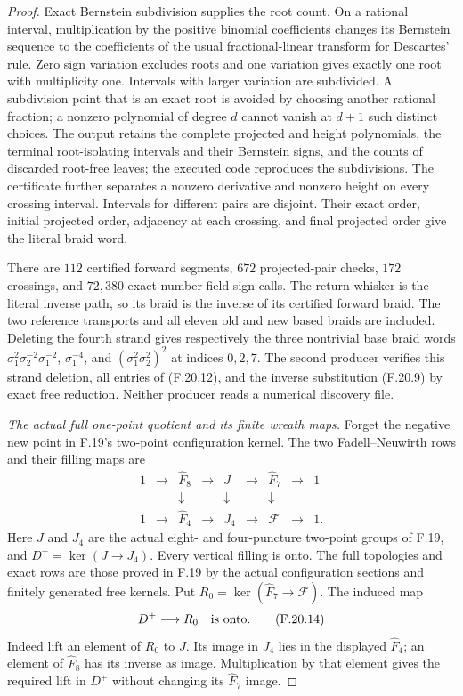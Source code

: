 \begin{proof}
Exact Bernstein subdivision supplies the root count.
On a rational interval, multiplication by the positive
binomial coefficients changes its Bernstein sequence
to the coefficients of the usual fractional-linear
transform for Descartes' rule. Zero sign variation
excludes roots and one variation gives exactly one
root with multiplicity one. Intervals with larger
variation are subdivided. A subdivision point that
is an exact root is avoided by choosing another
rational fraction; a nonzero polynomial of degree
$d$ cannot vanish at $d+1$ such distinct choices.
The output retains the complete projected and height
polynomials, the terminal root-isolating intervals
and their Bernstein signs, and the counts of discarded
root-free leaves; the executed code reproduces the
subdivisions. The certificate further
separates a nonzero derivative and nonzero height
on every crossing interval.
Intervals for different pairs are disjoint.
Their exact order, initial projected order,
adjacency at each crossing, and final projected
order give the literal braid word.

There are $112$ certified forward segments,
$672$ projected-pair checks, $172$ crossings, and
$72,380$ exact number-field sign calls.
The return whisker is the literal inverse path,
so its braid is the inverse of its certified
forward braid. The two reference transports and
all eleven old and new based braids are included.
Deleting the fourth strand gives respectively the
three nontrivial base braid words
$\sigma_1^2\sigma_2^{-2}\sigma_1^{-2}$,
$\sigma_1^{-4}$, and
$(\sigma_1^2\sigma_2^2)^2$ at indices $0,2,7$.
The second producer verifies this strand deletion,
all entries of (F.20.12), and the inverse substitution
(F.20.9) by exact free reduction.
Neither producer reads a numerical discovery file.

\emph{The actual full one-point quotient and its finite wreath maps.}
Forget the negative new point in F.19's two-point
configuration kernel. The two Fadell--Neuwirth rows
and their filling maps are
\[
 \begin{array}{ccccccccc}
 1&\longrightarrow&\widehat F_8&\longrightarrow&J
                 &\longrightarrow&\widehat F_7&\longrightarrow&1\\
 &&\downarrow&&\downarrow&&\downarrow\\
 1&\longrightarrow&\widehat F_4&\longrightarrow&J_4
                 &\longrightarrow&\mathcal F&\longrightarrow&1 .
 \end{array}                                                  \tag{F.20.13}
\]
Here $J$ and $J_4$ are the actual eight- and four-puncture
two-point groups of F.19, and $D^+=\ker(J\to J_4)$.
Every vertical filling is onto. The full topologies
and exact rows are those proved in F.19 by the
actual configuration sections and finitely generated
free kernels.
Put $R_0=\ker(\widehat F_7\to\mathcal F)$.
The induced map
\[
                         D^+\longrightarrow R_0
                         \quad\hbox{is onto}.               \tag{F.20.14}
\]
Indeed lift an element of $R_0$ to $J$.
Its image in $J_4$ lies in the displayed $\widehat F_4$;
an element of $\widehat F_8$ has its inverse as image.
Multiplication by that element gives the required
lift in $D^+$ without changing its $\widehat F_7$ image.


\end{proof}
